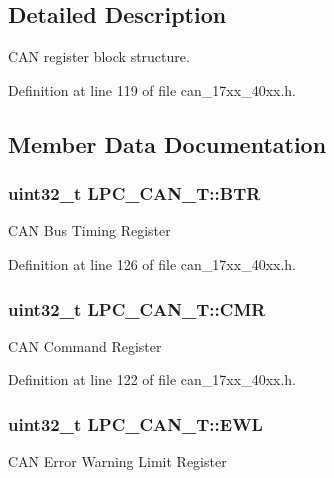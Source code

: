 \subsection{Detailed Description}
C\+AN register block structure. 

Definition at line 119 of file can\+\_\+17xx\+\_\+40xx.\+h.



\subsection{Member Data Documentation}
\subsubsection[{\texorpdfstring{B\+TR}{BTR}}]{ uint32\+\_\+t L\+P\+C\+\_\+\+C\+A\+N\+\_\+\+T\+::\+B\+TR}\hypertarget{structLPC__CAN__T_a2ef6231da82a2f3f55f05797f8ac4fa0}{}\label{structLPC__CAN__T_a2ef6231da82a2f3f55f05797f8ac4fa0}
C\+AN Bus Timing Register 

Definition at line 126 of file can\+\_\+17xx\+\_\+40xx.\+h.

\subsubsection[{\texorpdfstring{C\+MR}{CMR}}]{ uint32\+\_\+t L\+P\+C\+\_\+\+C\+A\+N\+\_\+\+T\+::\+C\+MR}\hypertarget{structLPC__CAN__T_a2b22d55ceb4c934524714384f23cc87e}{}\label{structLPC__CAN__T_a2b22d55ceb4c934524714384f23cc87e}
C\+AN Command Register 

Definition at line 122 of file can\+\_\+17xx\+\_\+40xx.\+h.

\subsubsection[{\texorpdfstring{E\+WL}{EWL}}]{ uint32\+\_\+t L\+P\+C\+\_\+\+C\+A\+N\+\_\+\+T\+::\+E\+WL}\hypertarget{structLPC__CAN__T_ab79cd2d466c6f59c3bb43873fd556af6}{}\label{structLPC__CAN__T_ab79cd2d466c6f59c3bb43873fd556af6}
C\+AN Error Warning Limit Register 

